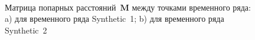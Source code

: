 \documentclass[12pt, twoside]{article}
\numberwithin{equation}{section}
\begin{document}
\begin{figure}[h!t]\center
{}
\\
\caption{Матрица попарных расстояний~$\textbf{M}$ между точками временного ряда: a) для временного ряда Synthetic~1; b) для временного ряда Synthetic~2}
\label{fig_synthetic_distance}
\end{figure}
\end{document}
